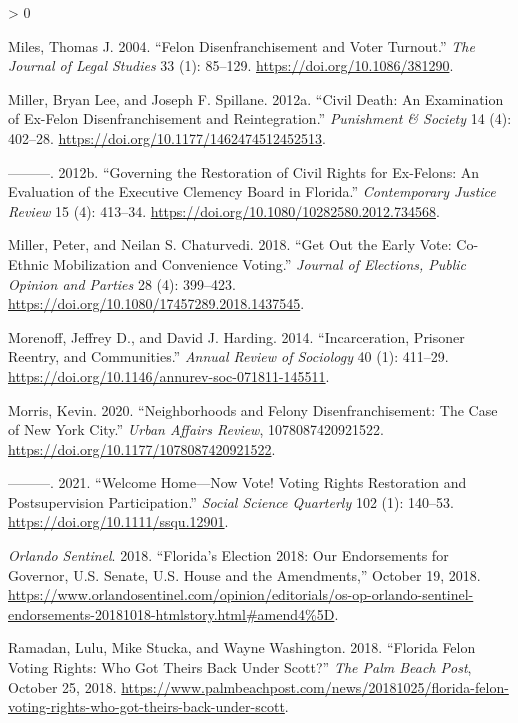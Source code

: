 \documentclass[
  12pt,
]{article}
\newlength{\cslhangindent}
\newenvironment{CSLReferences}[2] %
 {%
  \setlength{\parindent}{0pt}
  \ifodd #1 \everypar{\setlength{\hangindent}{\cslhangindent}}\ignorespaces\fi
  \ifnum #2 > 0
  \setlength{\parskip}{#2\baselineskip}
  \fi
 }%
 {}
\begin{document}
\begin{CSLReferences}{1}{0}
\leavevmode\hypertarget{ref-Miles2004}{}%
Miles, Thomas J. 2004. {``Felon {Disenfranchisement} and {Voter Turnout}.''} \emph{The Journal of Legal Studies} 33 (1): 85--129. \url{https://doi.org/10.1086/381290}.

\leavevmode\hypertarget{ref-Miller2012}{}%
Miller, Bryan Lee, and Joseph F. Spillane. 2012a. {``Civil Death: {An} Examination of Ex-Felon Disenfranchisement and Reintegration.''} \emph{Punishment \& Society} 14 (4): 402--28. \url{https://doi.org/10.1177/1462474512452513}.

\leavevmode\hypertarget{ref-Miller2012a}{}%
---------. 2012b. {``Governing the Restoration of Civil Rights for Ex-Felons: An Evaluation of the {Executive Clemency Board} in {Florida}.''} \emph{Contemporary Justice Review} 15 (4): 413--34. \url{https://doi.org/10.1080/10282580.2012.734568}.

\leavevmode\hypertarget{ref-Miller2018}{}%
Miller, Peter, and Neilan S. Chaturvedi. 2018. {``Get Out the Early Vote: Co-Ethnic Mobilization and Convenience Voting.''} \emph{Journal of Elections, Public Opinion and Parties} 28 (4): 399--423. \url{https://doi.org/10.1080/17457289.2018.1437545}.

\leavevmode\hypertarget{ref-Morenoff2014}{}%
Morenoff, Jeffrey D., and David J. Harding. 2014. {``Incarceration, {Prisoner Reentry}, and {Communities}.''} \emph{Annual Review of Sociology} 40 (1): 411--29. \url{https://doi.org/10.1146/annurev-soc-071811-145511}.

\leavevmode\hypertarget{ref-Morris2020}{}%
Morris, Kevin. 2020. {``Neighborhoods and {Felony Disenfranchisement}: {The Case} of {New York City}.''} \emph{Urban Affairs Review}, 1078087420921522. \url{https://doi.org/10.1177/1078087420921522}.

\leavevmode\hypertarget{ref-Morris2021}{}%
---------. 2021. {``Welcome {Home}---{Now Vote}! {Voting Rights Restoration} and {Postsupervision Participation}.''} \emph{Social Science Quarterly} 102 (1): 140--53. \url{https://doi.org/10.1111/ssqu.12901}.

\leavevmode\hypertarget{ref-ORLANDOSENTINEL2018}{}%
\emph{Orlando Sentinel}. 2018. {``Florida's {Election} 2018: {Our} Endorsements for Governor, {U}.{S}. {Senate}, {U}.{S}. {House} and the Amendments,''} October 19, 2018. \url{https://www.orlandosentinel.com/opinion/editorials/os-op-orlando-sentinel-endorsements-20181018-htmlstory.html\#amend4\%5D}.

\leavevmode\hypertarget{ref-Ramadan2018}{}%
Ramadan, Lulu, Mike Stucka, and Wayne Washington. 2018. {``Florida Felon Voting Rights: {Who} Got Theirs Back Under {Scott}?''} \emph{The Palm Beach Post}, October 25, 2018. \url{https://www.palmbeachpost.com/news/20181025/florida-felon-voting-rights-who-got-theirs-back-under-scott}.


\end{CSLReferences}
\end{document}
